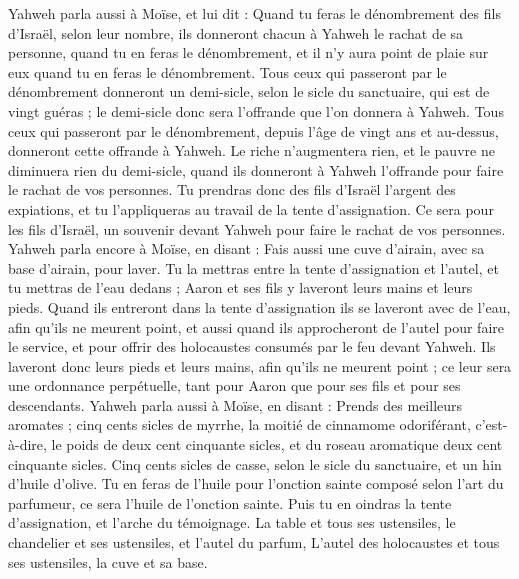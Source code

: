 \begin{multicols}{2}
Yahweh parla aussi à Moïse, et lui dit :
Quand tu feras le dénombrement des fils d'Israël, selon leur nombre, ils donneront chacun à Yahweh le rachat de sa personne, quand tu en feras le dénombrement, et il n'y aura point de plaie sur eux quand tu en feras le dénombrement.
Tous ceux qui passeront par le dénombrement donneront un demi-sicle, selon le sicle du sanctuaire, qui est de vingt guéras ; le demi-sicle donc sera l'offrande que l'on donnera à Yahweh.
Tous ceux qui passeront par le dénombrement, depuis l'âge de vingt ans et au-dessus, donneront cette offrande à Yahweh.
Le riche n'augmentera rien, et le pauvre ne diminuera rien du demi-sicle, quand ils donneront à Yahweh l'offrande pour faire le rachat de vos personnes.
Tu prendras donc des fils d'Israël l'argent des expiations, et tu l'appliqueras au travail de la tente d'assignation. Ce sera pour les fils d'Israël, un souvenir devant Yahweh pour faire le rachat de vos personnes.
Yahweh parla encore à Moïse, en disant :
Fais aussi une cuve d'airain, avec sa base d'airain, pour laver. Tu la mettras entre la tente d'assignation et l'autel, et tu mettras de l'eau dedans ;
Aaron et ses fils y laveront leurs mains et leurs pieds.
Quand ils entreront dans la tente d'assignation ils se laveront avec de l'eau, afin qu'ils ne meurent point, et aussi quand ils approcheront de l'autel pour faire le service, et pour offrir des holocaustes consumés par le feu devant Yahweh.
Ils laveront donc leurs pieds et leurs mains, afin qu'ils ne meurent point ; ce leur sera une ordonnance perpétuelle, tant pour Aaron que pour ses fils et pour ses descendants.
Yahweh parla aussi à Moïse, en disant :
Prends des meilleurs aromates ; cinq cents sicles de myrrhe, la moitié de cinnamome odoriférant, c'est-à-dire, le poids de deux cent cinquante sicles, et du roseau aromatique deux cent cinquante sicles.
Cinq cents sicles de casse, selon le sicle du sanctuaire, et un hin d'huile d'olive.
Tu en feras de l'huile pour l'onction sainte composé selon l’art du parfumeur, ce sera l'huile de l'onction sainte.
Puis tu en oindras la tente d'assignation, et l'arche du témoignage.
La table et tous ses ustensiles, le chandelier et ses ustensiles, et l'autel du parfum,
L'autel des holocaustes et tous ses ustensiles, la cuve et sa base.

\end{multicols}
